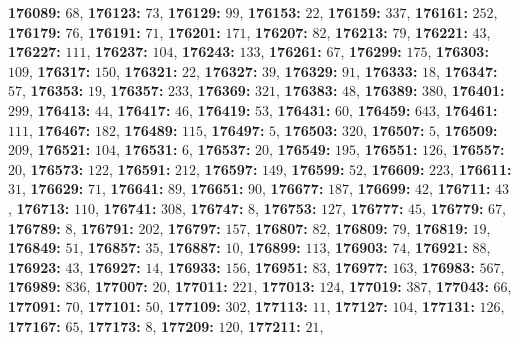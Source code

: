 \textsf{\bfseries 176089:} $68$, \textsf{\bfseries 176123:} $73$, \textsf{\bfseries 176129:} $99$, \textsf{\bfseries 176153:} $22$, \textsf{\bfseries 176159:} $337$, \textsf{\bfseries 176161:} $252$, \textsf{\bfseries 176179:} $76$, \textsf{\bfseries 176191:} $71$, \textsf{\bfseries 176201:} $171$, \textsf{\bfseries 176207:} $82$, \textsf{\bfseries 176213:} $79$, \textsf{\bfseries 176221:} $43$, \textsf{\bfseries 176227:} $111$, \textsf{\bfseries 176237:} $104$, \textsf{\bfseries 176243:} $133$, \textsf{\bfseries 176261:} $67$, \textsf{\bfseries 176299:} $175$, \textsf{\bfseries 176303:} $109$, \textsf{\bfseries 176317:} $150$, \textsf{\bfseries 176321:} $22$, \textsf{\bfseries 176327:} $39$, \textsf{\bfseries 176329:} $91$, \textsf{\bfseries 176333:} $18$, \textsf{\bfseries 176347:} $57$, \textsf{\bfseries 176353:} $19$, \textsf{\bfseries 176357:} $233$, \textsf{\bfseries 176369:} $321$, \textsf{\bfseries 176383:} $48$, \textsf{\bfseries 176389:} $380$, \textsf{\bfseries 176401:} $299$, \textsf{\bfseries 176413:} $44$, \textsf{\bfseries 176417:} $46$, \textsf{\bfseries 176419:} $53$, \textsf{\bfseries 176431:} $60$, \textsf{\bfseries 176459:} $643$, \textsf{\bfseries 176461:} $111$, \textsf{\bfseries 176467:} $182$, \textsf{\bfseries 176489:} $115$, \textsf{\bfseries 176497:} $5$, \textsf{\bfseries 176503:} $320$, \textsf{\bfseries 176507:} $5$, \textsf{\bfseries 176509:} $209$, \textsf{\bfseries 176521:} $104$, \textsf{\bfseries 176531:} $6$, \textsf{\bfseries 176537:} $20$, \textsf{\bfseries 176549:} $195$, \textsf{\bfseries 176551:} $126$, \textsf{\bfseries 176557:} $20$, \textsf{\bfseries 176573:} $122$, \textsf{\bfseries 176591:} $212$, \textsf{\bfseries 176597:} $149$, \textsf{\bfseries 176599:} $52$, \textsf{\bfseries 176609:} $223$, \textsf{\bfseries 176611:} $31$, \textsf{\bfseries 176629:} $71$, \textsf{\bfseries 176641:} $89$, \textsf{\bfseries 176651:} $90$, \textsf{\bfseries 176677:} $187$, \textsf{\bfseries 176699:} $42$, \textsf{\bfseries 176711:} $43$, \textsf{\bfseries 176713:} $110$, \textsf{\bfseries 176741:} $308$, \textsf{\bfseries 176747:} $8$, \textsf{\bfseries 176753:} $127$, \textsf{\bfseries 176777:} $45$, \textsf{\bfseries 176779:} $67$, \textsf{\bfseries 176789:} $8$, \textsf{\bfseries 176791:} $202$, \textsf{\bfseries 176797:} $157$, \textsf{\bfseries 176807:} $82$, \textsf{\bfseries 176809:} $79$, \textsf{\bfseries 176819:} $19$, \textsf{\bfseries 176849:} $51$, \textsf{\bfseries 176857:} $35$, \textsf{\bfseries 176887:} $10$, \textsf{\bfseries 176899:} $113$, \textsf{\bfseries 176903:} $74$, \textsf{\bfseries 176921:} $88$, \textsf{\bfseries 176923:} $43$, \textsf{\bfseries 176927:} $14$, \textsf{\bfseries 176933:} $156$, \textsf{\bfseries 176951:} $83$, \textsf{\bfseries 176977:} $163$, \textsf{\bfseries 176983:} $567$, \textsf{\bfseries 176989:} $836$, \textsf{\bfseries 177007:} $20$, \textsf{\bfseries 177011:} $221$, \textsf{\bfseries 177013:} $124$, \textsf{\bfseries 177019:} $387$, \textsf{\bfseries 177043:} $66$, \textsf{\bfseries 177091:} $70$, \textsf{\bfseries 177101:} $50$, \textsf{\bfseries 177109:} $302$, \textsf{\bfseries 177113:} $11$, \textsf{\bfseries 177127:} $104$, \textsf{\bfseries 177131:} $126$, \textsf{\bfseries 177167:} $65$, \textsf{\bfseries 177173:} $8$, \textsf{\bfseries 177209:} $120$, \textsf{\bfseries 177211:} $21$, 
